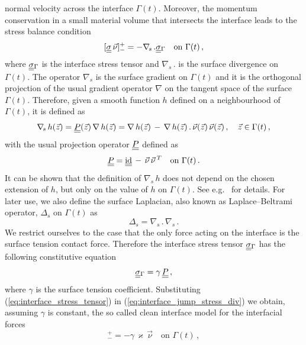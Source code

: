 \documentclass[a4paper,12pt,onecolumn]{article}
\newcommand{\nabs}{\nabla_{\!s}}
\newcommand{\id}{\rm id}
\newcommand{\mat}[1]{\underline{\underline{#1}}\rule{0pt}{0pt}}
\begin{document}
normal velocity across the interface $\Gamma(t)$. Moreover, the momentum
conservation in a small material volume that intersects the interface leads to
the stress balance condition
\begin{equation}\label{eq:interface_jump_stress_div}
[\mat\sigma\,\vec \nu]_-^+ = -\nabs\,.\mat\sigma_{\Gamma} \quad \mbox{on }
\Gamma(t)\,,
\end{equation}
where $\mat\sigma_{\Gamma}$ is the interface stress tensor and $\nabs\,.$ is
the surface divergence on $\Gamma(t)$. The operator $\nabs$ is the surface
gradient on $\Gamma(t)$ and it is the orthogonal projection of the usual
gradient operator $\nabla$ on the tangent space of the surface $\Gamma(t)$.
Therefore, given a smooth function $h$ defined on a neighbourhood of
$\Gamma(t)$, it is defined as
\begin{equation}\label{eq:surface_gradient}
\nabs\,h(\vec z)=\mat P(\vec z)\,\nabla\,h(\vec z)=\nabla\,h(\vec z)\,-
\,\nabla\,h(\vec z)\,.\,\vec\nu(\vec z)\,\vec\nu(\vec z)\,,\quad \vec z
\in\Gamma(t)\,,
\end{equation}
with the usual projection operator $\mat P$ defined as
\begin{equation}\label{eq:surface_projection}
\mat P=\mat\id\,-\,\vec\nu\,\vec\nu\,^T\quad \mbox{on } \Gamma(t)\,.
\end{equation}
It can be shown that the definition of $\nabs\,h$ does not depend on the chosen
extension of $h$, but only on the value of $h$ on $\Gamma(t)$. See e.g.\
\cite[\S2.1]{DeckelnickDE05} for details.
For later use, we also define the surface
Laplacian, also known as Laplace--Beltrami operator, $\Delta_s$ on $\Gamma(t)$
as
\begin{equation}\label{eq:surface_laplacian}
\Delta_s = \nabs\,.\,\nabs\,.
\end{equation}
We restrict ourselves to the case that the only force acting on the interface
is the surface tension contact force. Therefore the interface stress tensor
$\mat\sigma_\Gamma$ has the following constitutive equation
\begin{equation}\label{eq:interface_stress_tensor}
\mat\sigma_{\Gamma}=\gamma\,\mat P\,,
\end{equation}
where $\gamma$ is the surface tension coefficient. Substituting
(\ref{eq:interface_stress_tensor}) in (\ref{eq:interface_jump_stress_div}) we
obtain, assuming $\gamma$ is constant, the so called clean interface model for
the interfacial forces
\begin{equation}
[\mat\sigma\,\vec \nu]_-^+ = -\gamma\,\varkappa\,\vec\nu \quad \mbox{on }
\Gamma(t)\,,
\end{equation}
\end{document}
